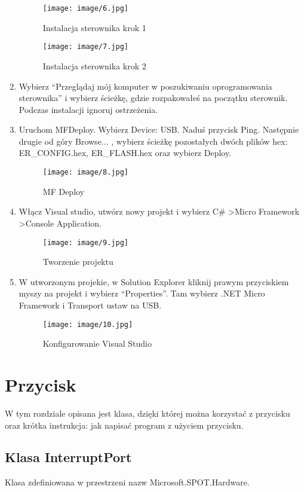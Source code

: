 \documentclass{article}
\begin{document}
\begin{enumerate}
\begin{figure}[H]
\texttt{[image: image/6.jpg]}
\caption{Instalacja sterownika krok 1}
\end{figure}
\begin{figure}[H]
\texttt{[image: image/7.jpg]}
\caption{Instalacja sterownika krok 2}
\end{figure}

\item Wybierz “Przeglądaj mój komputer w poszukiwaniu oprogramowania sterownika” i wybierz ścieżkę, gdzie rozpakowałeś na początku sterownik. Podczas instalacji ignoruj ostrzeżenia.
\item Uruchom MFDeploy. Wybierz Device: USB. Naduś przycisk Ping. Następnie drugie od góry Browse... , wybierz ścieżkę pozostałych dwóch plików hex: ER\_CONFIG.hex, ER\_FLASH.hex oraz wybierz Deploy.

\begin{figure}[H]
\texttt{[image: image/8.jpg]}
\caption{MF Deploy}
\end{figure}
\item Włącz Visual studio, utwórz nowy projekt i wybierz C\# \textgreater Micro Framework \textgreater Console Application.

\begin{figure}[H]
\texttt{[image: image/9.jpg]}
\caption{Tworzenie projektu}
\end{figure}
\item W utworzonym projekie, w Solution Explorer kliknij prawym przyciskiem myszy na projekt i wybierz “Properties”. Tam wybierz .NET Micro Framework i Transport ustaw na USB.

\begin{figure}[H]
\texttt{[image: image/10.jpg]}
\caption{Konfigurowanie Visual Studio}
\end{figure}
\end{enumerate}

\section{Przycisk}
W tym rozdziale opisana jest klasa, dzięki której można korzystać z przycisku oraz krótka instrukcja: jak napisać program z użyciem przycisku.
\subsection{Klasa InterruptPort}
Klasa zdefiniowana w przestrzeni nazw Microsoft.SPOT.Hardware.
\end{document}
